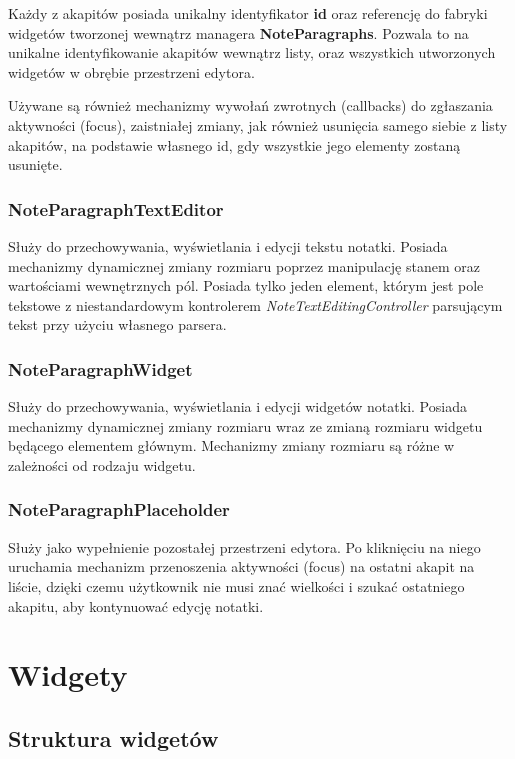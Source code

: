 Każdy z akapitów posiada unikalny identyfikator \textbf{id} oraz referencję do fabryki widgetów tworzonej wewnątrz managera \textbf{NoteParagraphs}.
Pozwala to na unikalne identyfikowanie akapitów wewnątrz listy, oraz wszystkich utworzonych widgetów w obrębie przestrzeni edytora.

Używane są również mechanizmy wywołań zwrotnych (callbacks) do zgłaszania aktywności (focus), zaistniałej zmiany, jak również usunięcia samego siebie z listy akapitów, na podstawie własnego id, gdy wszystkie jego elementy zostaną usunięte.

\subsubsection{NoteParagraphTextEditor}

Służy do przechowywania, wyświetlania i edycji tekstu notatki. Posiada mechanizmy dynamicznej zmiany rozmiaru poprzez manipulację stanem oraz wartościami wewnętrznych pól. Posiada tylko jeden element, którym jest pole tekstowe z niestandardowym kontrolerem \textit{NoteTextEditingController} parsującym tekst przy użyciu własnego parsera.

\subsubsection{NoteParagraphWidget}

Służy do przechowywania, wyświetlania i edycji widgetów notatki. Posiada mechanizmy dynamicznej zmiany rozmiaru wraz ze zmianą rozmiaru widgetu będącego elementem głównym. Mechanizmy zmiany rozmiaru są różne w zależności od rodzaju widgetu.

\subsubsection{NoteParagraphPlaceholder}

Służy jako wypełnienie pozostałej przestrzeni edytora. Po kliknięciu na niego uruchamia mechanizm przenoszenia aktywności (focus) na ostatni akapit na liście, dzięki czemu użytkownik nie musi znać wielkości i szukać ostatniego akapitu, aby kontynuować edycję notatki.


\section{Widgety}

\subsection{Struktura widgetów}

